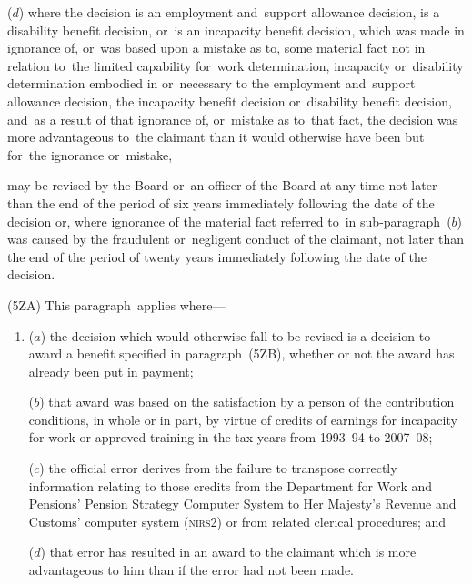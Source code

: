 \documentclass[12pt,a4paper]{article}
\begin{document}
\begin{enumerate}
($d$) where the decision 
is an employment and~support allowance decision,  %
is a disability benefit decision, or~is an incapacity benefit decision, which was made in ignorance of, or~was based upon a mistake as to, some material fact not in relation to~the 
limited capability for~work determination,  %
incapacity or~disability determination embodied in or~necessary to 
the employment and~support allowance decision,  %
the incapacity benefit decision or~disability benefit decision, and~as a result of that ignorance of, or~mistake as to~that fact, the decision was more advantageous to~the claimant than it would otherwise have been but for~the ignorance or~mistake,
\end{enumerate}
may be revised 
by the Board or~an officer of the Board at any time not later than the end of the period of six years immediately following the date of the decision or, where ignorance of the material fact referred to~in sub-paragraph~($b$)  was caused by the fraudulent or~negligent conduct of the claimant, not later than the end of the period of twenty years immediately following the date of the decision.  %

(5ZA) This paragraph~applies where—
\begin{enumerate}\item[]
($a$) the decision which would otherwise fall to be revised is a decision to award a benefit specified in paragraph~(5ZB), whether or not the award has already been put in payment;

($b$) that award was based on the satisfaction by a person of the contribution conditions, in whole or in part, by virtue of credits of earnings for incapacity for work or approved training in the tax years from 1993--94 to 2007--08;

($c$) the official error derives from the failure to transpose correctly information relating to those credits from the Department for Work and Pensions’ Pension Strategy Computer System to Her Majesty’s Revenue and Customs’ computer system (\textsc{\lowercase{NIRS2}}) or from related clerical procedures; and

($d$) that error has resulted in an award to the claimant which is more advantageous to him than if the error had not been made.
\end{enumerate}
\end{document}
